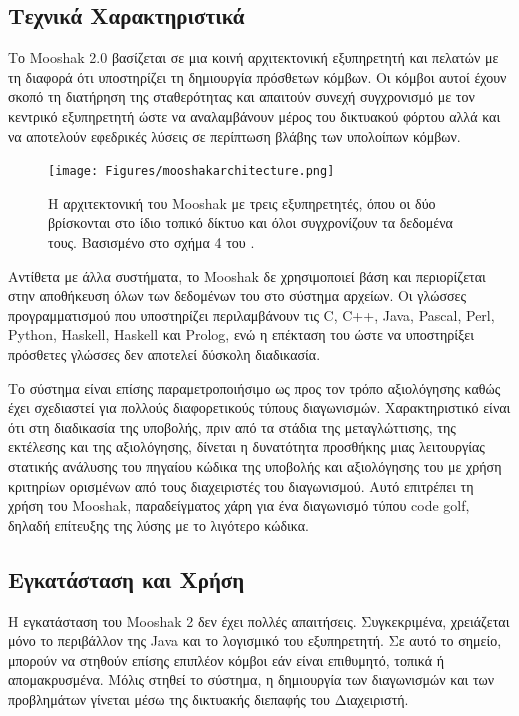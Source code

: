 \documentclass[diploma]{softlab-thesis}
\begin{document}
\subsection{Τεχνικά Χαρακτηριστικά}

Το Mooshak 2.0 βασίζεται σε μια κοινή αρχιτεκτονική εξυπηρετητή και πελατών με τη
διαφορά ότι υποστηρίζει τη δημιουργία πρόσθετων κόμβων. Οι κόμβοι αυτοί έχουν σκοπό
τη διατήρηση της σταθερότητας και απαιτούν συνεχή συγχρονισμό με τον κεντρικό
εξυπηρετητή ώστε να αναλαμβάνουν μέρος του δικτυακού φόρτου αλλά και να αποτελούν
εφεδρικές λύσεις σε περίπτωση βλάβης των υπολοίπων κόμβων.

\bigskip

\begin{figure}
  \centering
  \texttt{[image: Figures/mooshakarchitecture.png]}
  \caption[Η αρχιτεκτονική του Mooshak]{Η αρχιτεκτονική του Mooshak με τρεις
  εξυπηρετητές, όπου οι δύο βρίσκονται στο ίδιο τοπικό δίκτυο και όλοι
  συγχρονίζουν τα δεδομένα τους. Βασισμένο στο σχήμα 4 του
  \cite{leal2003mooshak}.}
\end{figure}

\bigskip

Αντίθετα με άλλα συστήματα, το Mooshak δε χρησιμοποιεί βάση και περιορίζεται
στην αποθήκευση όλων των δεδομένων του στο σύστημα αρχείων. Οι γλώσσες
προγραμματισμού που υποστηρίζει περιλαμβάνουν τις C, C++, Java, Pascal, Perl,
Python, Haskell, Haskell και Prolog, ενώ η επέκταση του ώστε να υποστηρίξει
πρόσθετες γλώσσες δεν αποτελεί δύσκολη διαδικασία.

\bigskip

Το σύστημα είναι επίσης παραμετροποιήσιμο ως προς τον τρόπο αξιολόγησης καθώς
έχει σχεδιαστεί για πολλούς διαφορετικούς τύπους διαγωνισμών. Χαρακτηριστικό
είναι ότι στη διαδικασία της υποβολής, πριν από τα στάδια της μεταγλώττισης,
της εκτέλεσης και της αξιολόγησης, δίνεται η δυνατότητα προσθήκης μιας
λειτουργίας στατικής ανάλυσης του πηγαίου κώδικα της υποβολής και αξιολόγησης
του με χρήση κριτηρίων ορισμένων από τους διαχειριστές του διαγωνισμού. Αυτό
επιτρέπει τη χρήση του Mooshak, παραδείγματος χάρη για ένα διαγωνισμό τύπου
code golf, δηλαδή επίτευξης της λύσης με το λιγότερο κώδικα.

\subsection{Εγκατάσταση και Χρήση}

Η εγκατάσταση του Mooshak 2 δεν έχει πολλές απαιτήσεις. Συγκεκριμένα,
χρειάζεται μόνο το περιβάλλον της Java και το λογισμικό του εξυπηρετητή. Σε
αυτό το σημείο, μπορούν να στηθούν επίσης επιπλέον κόμβοι εάν είναι επιθυμητό,
τοπικά ή απομακρυσμένα. Μόλις στηθεί το σύστημα, η δημιουργία των διαγωνισμών
και των προβλημάτων γίνεται μέσω της δικτυακής διεπαφής του Διαχειριστή.
\end{document}
